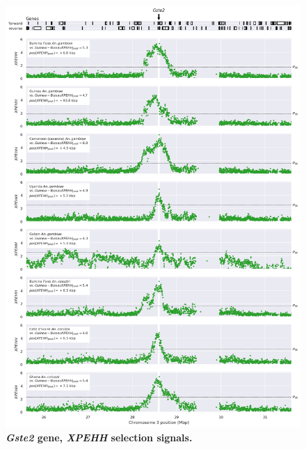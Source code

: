 \documentclass[a4paper,11pt,abstracton,hidelinks]{scrartcl}
\begin{document}
\begin{figure}[t!]
	\begin{center}
		\includegraphics*[width=1\linewidth,center]{artwork/locus_gste2_xpehh_pdist.png}
	\end{center}
	\caption[\textit{Gste2} gene, \textit{XPEHH} selection signals]{
	\textbf{\textit{Gste2} gene, \textit{XPEHH} selection signals.}
	} 
	\label{fig:locus_gste2_xpehh}
\end{figure}


\end{document}
